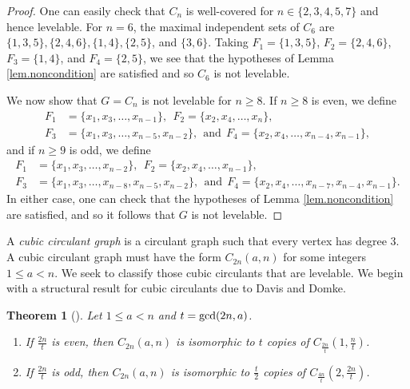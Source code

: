 \documentclass[12pt]{amsart}
\numberwithin{equation}{section}
\newtheorem{theorem}{Theorem}[section]
\theoremstyle{definition}
\newcounter{i} %
\begin{document}
\begin{proof}
One can easily check that $C_n$ is well-covered for $n\in \{2,3,4,5,7\}$ and hence levelable. For $n=6$, the maximal independent sets of $C_6$ are $\{1,3,5\}, \{2,4,6\}, \{1,4\}, \{2,5\}$, and $\{3,6\}$. Taking $F_1=\{1,3,5\}$, $F_2=\{2,4,6\}$, $F_3=\{1,4\}$, and $F_4=\{2,5\}$, we see that the hypotheses of Lemma \ref{lem.noncondition}
are satisfied and so $C_6$ is not levelable.

We now show that $G=C_n$ is not levelable for $n\geq 8$.
If $n\geq 8$ is even, we define
    \begin{align*}
        F_1 &= \{ x_1,x_3,\dots,x_{n-1} \}, 
        ~~F_2 = \{ x_2,x_4,\dots,x_{n} \}, \\
        F_3 &= \{ x_1,x_3,\dots,x_{n-5},x_{n-2}\}, 
        ~~\mbox{and}
        ~~F_4 = \{x_2,x_4,\dots,x_{n-4},x_{n-1}\},
    \end{align*}
    and if $n\geq 9$ is odd, we define
    \begin{align*}
        F_1 &= \{ x_1,x_3,\dots,x_{n-2} \}, ~~
        F_2 = \{ x_2,x_4,\dots,x_{n-1} \}, \\
        F_3 &= \{ x_1,x_3,\dots,x_{n-8},x_{n-5},x_{n-2}\},
        ~~\mbox{and}~~
        F_4 = \{x_2,x_4,\dots,x_{n-7},x_{n-4},x_{n-1}\}.
    \end{align*}
    In either case, one can check that the hypotheses of Lemma \ref{lem.noncondition} are satisfied, and so it follows that $G$ is not levelable.
\end{proof}

A \textit{cubic circulant graph} is a circulant graph such that every vertex has degree 3. 
A cubic circulant graph must have the
form $C_{2n}(a,n)$ for some integers $1 \leq a < n$.
We seek to classify those cubic circulants that are levelable. We begin with a structural result for cubic circulants due to Davis and Domke.


\begin{theorem}[\cite{DDG}]\label{isomorphic-a-n}
Let $1 \leq a < n$  and $t={\rm gcd}(2n,a)$. 
\begin{enumerate}
\item[$(a)$] If $\frac{2n}{t}$ is even, then $C_{2n}(a,n)$ is isomorphic to $t$ copies of $C_{\frac{2n}{t}}(1,\frac{n}{t})$. 
\item[$(b)$] If $\frac{2n}{t}$ is odd, then $C_{2n}(a,n)$ is isomorphic to $\frac{t}{2}$ copies of $C_{\frac{4n}{t}}(2,\frac{2n}{t})$. 
\end{enumerate}
\end{theorem}
\end{document}
